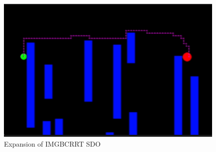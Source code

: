 \documentclass{article}
\begin{document}
\begin{figure}[h]
	\centerline{\includegraphics[scale=0.70]{IMGSDO.png}}
        \caption{Expansion of IMGBCRRT SDO}
\end{figure}














\end{document}
